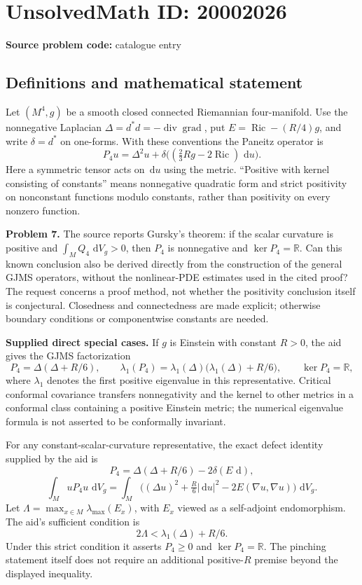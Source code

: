 \documentclass[11pt]{article}
\newcommand{\R}{\mathbb{R}}
\newcommand{\dd}{\,\mathrm{d}}
\begin{document}
\section*{UnsolvedMath ID: 20002026}
\textbf{Source problem code:} catalogue entry
\subsection{Definitions and mathematical statement}
Let $(M^4,g)$ be a smooth closed connected Riemannian four-manifold. Use the nonnegative Laplacian $\Delta=d^*d=-\operatorname{div}\operatorname{grad}$, put $E=\operatorname{Ric}-(R/4)g$, and write $\delta=d^*$ on one-forms. With these conventions the Paneitz operator is
\[
 P_4u=\Delta^2u+\delta\bigl((\tfrac23Rg-2\operatorname{Ric})\,\dd u\bigr).
\]
Here a symmetric tensor acts on $\dd u$ using the metric. ``Positive with kernel consisting of constants'' means nonnegative quadratic form and strict positivity on nonconstant functions modulo constants, rather than positivity on every nonzero function.

\textbf{Problem 7.} The source reports Gursky's theorem: if the scalar curvature is positive and $\int_MQ_4\,\dd V_g>0$, then $P_4$ is nonnegative and $\ker P_4=\R$. Can this known conclusion also be derived directly from the construction of the general GJMS operators, without the nonlinear-PDE estimates used in the cited proof? The request concerns a proof method, not whether the positivity conclusion itself is conjectural. Closedness and connectedness are made explicit; otherwise boundary conditions or componentwise constants are needed.

\textbf{Supplied direct special cases.} If $g$ is Einstein with constant $R>0$, the aid gives the GJMS factorization
\[
 P_4=\Delta(\Delta+R/6),\qquad
 \lambda_1(P_4)=\lambda_1(\Delta)\bigl(\lambda_1(\Delta)+R/6\bigr),
 \qquad\ker P_4=\R,
\]
where $\lambda_1$ denotes the first positive eigenvalue in this representative. Critical conformal covariance transfers nonnegativity and the kernel to other metrics in a conformal class containing a positive Einstein metric; the numerical eigenvalue formula is not asserted to be conformally invariant.

For any constant-scalar-curvature representative, the exact defect identity supplied by the aid is
\[
 P_4=\Delta(\Delta+R/6)-2\delta(E\,\dd),
\]
\[
 \int_MuP_4u\,\dd V_g
 =\int_M\bigl((\Delta u)^2+\tfrac R6|\dd u|^2
                         -2E(\nabla u,\nabla u)\bigr)\,\dd V_g.
\]
Let $\Lambda=\max_{x\in M}\lambda_{\max}(E_x)$, with $E_x$ viewed as a self-adjoint endomorphism. The aid's sufficient condition is
\[
 2\Lambda<\lambda_1(\Delta)+R/6.
\]
Under this strict condition it asserts $P_4\ge0$ and $\ker P_4=\R$. The pinching statement itself does not require an additional positive-$R$ premise beyond the displayed inequality.
\end{document}
